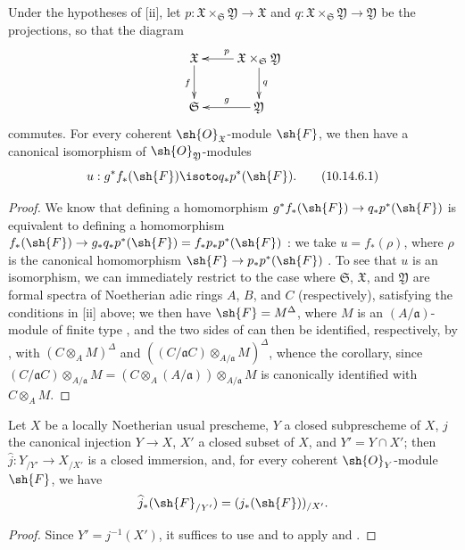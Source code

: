 \begin{corollary}[10.14.6]
\label{I.10.14.6}
Under the hypotheses of [ii], let $p:\mathfrak{X}\times_\mathfrak{S}\mathfrak{Y}\to\mathfrak{X}$ and $q:\mathfrak{X}\times_\mathfrak{S}\mathfrak{Y}\to\mathfrak{Y}$ be the projections, so that the diagram
\[
  \xymatrix{
    \mathfrak{X}\ar[d]_f &
    \mathfrak{X}\times_\mathfrak{S}\mathfrak{Y}\ar[l]_p\ar[d]^q\\
    \mathfrak{S} &
    \mathfrak{Y}\ar[l]_g
  }
\]
commutes.
For every coherent $\sh{O}_\mathfrak{X}$-module $\sh{F}$, we then have a canonical isomorphism of $\sh{O}_\mathfrak{Y}$-modules
\[
\label{I.10.14.6.1}
  u:g^*f_*(\sh{F})\isoto q_*p^*(\sh{F}).
  \tag{10.14.6.1}
\]
\end{corollary}

\begin{proof}
We know that defining a homomorphism $g^*f_*(\sh{F}) \to q_*p^*(\sh{F})$ is equivalent to defining a homomorphism $f_*(\sh{F}) \to g_*q_*p^*(\sh{F}) = f_*p_*p^*(\sh{F})$ :
we take $u=f_*(\rho)$, where $\rho$ is the canonical homomorphism $\sh{F}\to p_*p^*(\sh{F})$ .
To see that $u$ is an isomorphism, we can immediately restrict to the case where $\mathfrak{S}$, $\mathfrak{X}$, and $\mathfrak{Y}$ are formal spectra of Noetherian adic rings $A$, $B$, and $C$ (respectively), satisfying the conditions in [ii] above;
we then have $\sh{F}=M^\Delta$, where $M$ is an $(A/\mathfrak{a})$-module of finite type , and the two sides of  can then be identified, respectively, by , with $(C\otimes_A M)^\Delta$ and $((C/\mathfrak{a}C)\otimes_{A/\mathfrak{a}}M)^\Delta$, whence the corollary, since $(C/\mathfrak{a}C)\otimes_{A/\mathfrak{a}}M = (C\otimes_A(A/\mathfrak{a}))\otimes_{A/\mathfrak{a}}M$ is canonically identified with $C\otimes_A M$.
\end{proof}

\begin{corollary}[10.14.7]
\label{I.10.14.7}
Let $X$ be a locally Noetherian usual prescheme, $Y$ a closed subprescheme of $X$, $j$ the canonical injection $Y\to X$, $X'$ a closed subset of $X$, and $Y'=Y\cap X'$;
then $\widehat{j}:Y_{/Y'}\to X_{/X'}$ is a closed immersion, and, for every coherent $\sh{O}_Y$-module $\sh{F}$, we have
\[
    \widehat{j}_*(\sh{F}_{/Y'}) = (j_*(\sh{F}))_{/X'}.
\]
\end{corollary}

\begin{proof}
Since $Y'=j^{-1}(X')$, it suffices to use  and to apply  and .
\end{proof}

